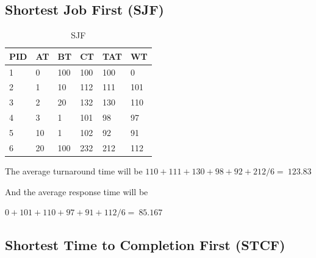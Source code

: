 \documentclass[11pt,a4paper]{article}
\theoremstyle{plain}
\theoremstyle{definition}
\theoremstyle{remark}
\numberwithin{equation}{section}
\begin{document}
\subsection*{Shortest Job First (SJF)}

\begin{table}[H]
	\centering
	\caption{SJF}
	\label{t2-sjf}
	\begin{tabular}{llllll}
		\hline
		\multicolumn{1}{|l|}{PID} & \multicolumn{1}{l|}{AT} & \multicolumn{1}{l|}{BT} & \multicolumn{1}{l|}{CT} & \multicolumn{1}{l|}{TAT} & \multicolumn{1}{l|}{WT} \\ \hline
		1                         & 0                       & 100                     & 100                     & 100                      & 0                       \\
		2                         & 1                       & 10                      & 112                     & 111                      & 101                     \\
		3                         & 2                       & 20                      & 132                     & 130                      & 110                     \\
		4                         & 3                       & 1                       & 101                     & 98                       & 97                      \\
		5                         & 10                      & 1                       & 102                     & 92                       & 91                      \\
		6                         & 20                      & 100                     & 232                     & 212                      & 112                    
	\end{tabular}
\end{table}


The average turnaround time will be $110+111+130+98+92+212/6=~123.83$

And the average response time will be

$0+101+110+97+91+112/6=~85.167$


\subsection*{Shortest Time to Completion First (STCF)}
\end{document}
